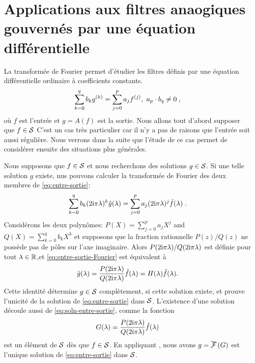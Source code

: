 \section{Applications aux filtres anaogiques gouvern\'es par une \'equation diff\'erentielle}
La transform\'ee de Fourier permet d'\'etudier les filtres d\'efinis par une \'equation diff\'erentielle ordinaire \`{a} coefficients constants.
\begin{equation}
\label{eq:entre-sortie}
\sum_{k=0}^{q}b_{k}g^{(k)}=\sum_{j=0}^{p}a_{j}f^{(j)},\ a_{p}\cdot b_{q}\neq 0 \;,
\end{equation}
o\`{u} $f$ est l'entr\'ee et $g=A(f)$ est la sortie. Nous allons tout d'abord supposer que $f \in \mathcal{S}$
C'est un cas tr\`es particulier car il n'y a pas de raisons que l'entr\'ee soit aussi r\'eguli\`ere. Nous verrons dans la suite que l'\'etude de ce cas permet de consid\'erer ensuite des situations plus g\'en\'erales.

Nous supposons que $f\in \mathcal{S}$ et nous recherchons des solutions $g \in \mathcal{S}$.
Si une telle solution $g$ existe, nus pouvons calculer la transform\'ee de Fourier des deux membres de \eqref{eq:entre-sortie}:
\begin{equation}
\label{eq:entre-sortie-Fourier}
\sum_{k=0}^{q}b_{k}(2\mathrm{i}\pi\lambda)^{k}\hat{g}(\lambda)=\sum_{j=0}^{p}a_{j}(2\mathrm{i} \pi\lambda)^{j}\hat{f}(\lambda) \;.
\end{equation}
Consid\'erons les deux polyn\^omes: $P(X)=\displaystyle \sum_{j=0}^{p}a_{j}X^{j}$ and $Q(X)=\displaystyle \sum_{k=0}^{q}b_{k}X^{k}$
et supposons que la fraction rationnelle $P(z)/Q(z)$ ne poss\`{e}de  pas de p\^oles sur l'axe imaginaire.
Alors $P(2 \mathrm{i} \pi\lambda)/Q(2 \mathrm{i} \pi\lambda)$ est d\'efinie pour tout $\lambda \in \mathbb{R}$,et \eqref{eq:entre-sortie-Fourier}
est \'equivalent \`{a}
\begin{equation}
\label{eq:soln-entre-sortie}
\hat{g}(\lambda)=\frac{P(2\mathrm{i}\pi\lambda)}{Q(2\mathrm{i}\pi\lambda)}\hat{f}(\lambda)= H(\lambda) \hat{f}(\lambda).
\end{equation}
Cette identit\'e d\'etermine $g \in \mathcal{S}$ compl\`etement, si cette solution existe, et prouve l'unicit\'e de la solution de \eqref{eq:entre-sortie} dans $\mathcal{S}$. L'existence d'une solution d\'ecoule aussi de \eqref{eq:soln-entre-sortie}, comme la fonction
$$
G(\lambda)=\frac{P(2 \mathrm{i} \pi\lambda)}{Q(2 \mathrm{i} \pi\lambda)}\hat{f}(\lambda)
$$
est un \'el\'ement de $\mathcal{S}$ d\`es que  $f \in \mathcal{S}$.
En appliquant , nous avons $g= \overline{\mathcal{F}}\left( G \right)$ est l'unique solution de \eqref{eq:entre-sortie} dans $\mathcal{S}$.

